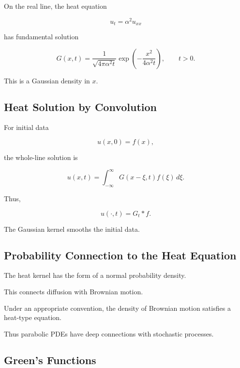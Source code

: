 On the real line, the heat equation

\[
u_t=\alpha^2u_{xx}
\]

has fundamental solution

\[
\boxed{
G(x,t)
=
\frac1{
\sqrt{
4\pi\alpha^2t
}
}
\exp
\left(
-
\frac{x^2}{
4\alpha^2t
}
\right),
\qquad
t>0.
}
\]

This is a Gaussian density in \(x\).

\subsection{Heat Solution by Convolution}
\label{subsec:heat-convolution-solution}

For initial data

\[
u(x,0)=f(x),
\]

the whole-line solution is

\[
\boxed{
u(x,t)
=
\int_{-\infty}^{\infty}
G(x-\xi,t)
f(\xi)
\,d\xi.
}
\]

Thus,

\[
\boxed{
u(\cdot,t)
=
G_t*f.
}
\]

The Gaussian kernel smooths the initial data.

\subsection{Probability Connection to the Heat Equation}
\label{subsec:heat-probability-connection}

The heat kernel has the form of a normal probability density.

This connects diffusion with Brownian motion.

Under an appropriate convention, the density of Brownian motion satisfies
a heat-type equation.

Thus parabolic PDEs have deep connections with stochastic processes.

\subsection{Green's Functions}
\label{subsec:pde-greens-functions}

